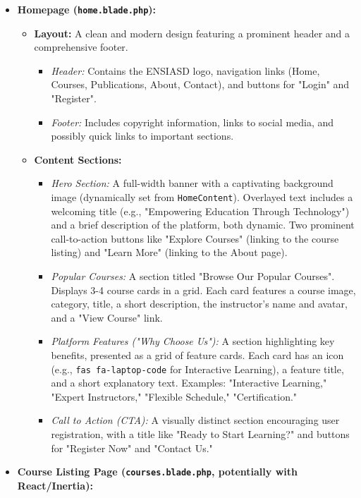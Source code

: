 \begin{itemize}
    \item \textbf{Homepage (\texttt{home.blade.php}):}
    \begin{itemize}
        \item \textbf{Layout:} A clean and modern design featuring a prominent header and a comprehensive footer.
        \begin{itemize}
            \item \textit{Header:} Contains the ENSIASD logo, navigation links (Home, Courses, Publications, About, Contact), and buttons for "Login" and "Register".
            \item \textit{Footer:} Includes copyright information, links to social media, and possibly quick links to important sections.
        \end{itemize}
        \item \textbf{Content Sections:}
        \begin{itemize}
            \item \textit{Hero Section:} A full-width banner with a captivating background image (dynamically set from \texttt{HomeContent}). Overlayed text includes a welcoming title (e.g., "Empowering Education Through Technology") and a brief description of the platform, both dynamic. Two prominent call-to-action buttons like "Explore Courses" (linking to the course listing) and "Learn More" (linking to the About page).
            \item \textit{Popular Courses:} A section titled "Browse Our Popular Courses". Displays 3-4 course cards in a grid. Each card features a course image, category, title, a short description, the instructor's name and avatar, and a "View Course" link.
            \item \textit{Platform Features ("Why Choose Us"):} A section highlighting key benefits, presented as a grid of feature cards. Each card has an icon (e.g., \texttt{fas fa-laptop-code} for Interactive Learning), a feature title, and a short explanatory text. Examples: "Interactive Learning," "Expert Instructors," "Flexible Schedule," "Certification."
            \item \textit{Call to Action (CTA):} A visually distinct section encouraging user registration, with a title like "Ready to Start Learning?" and buttons for "Register Now" and "Contact Us."
        \end{itemize}
    \end{itemize}
    \item \textbf{Course Listing Page (\texttt{courses.blade.php}, potentially with React/Inertia):}

\end{itemize}
